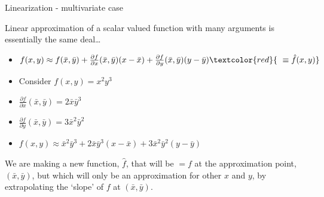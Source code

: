 \begin{frame}{Linearization - multivariate case}

Linear approximation of a scalar valued function with many arguments is essentially the same deal\ldots
\begin{itemize}
\item	$f(x,y) \approx f(\bar{x},\bar{y}) + \frac{\partial f}{\partial x}(\bar{x},\bar{y})(x-\bar{x}) + \frac{\partial f}{\partial y}(\bar{x},\bar{y})(y-\bar{y}) \textcolor{red}{\text{ }\equiv \hat{f}(x,y)}$
\end{itemize}

\begin{itemize}
\item	Consider $f(x,y) = x^{2} y^{3}$
\item	$\frac{\partial f}{\partial x}(\bar{x},\bar{y}) = 2\bar{x}\bar{y}^{3}$
\item	$\frac{\partial f}{\partial y}(\bar{x},\bar{y}) = 3\bar{x}^{2}\bar{y}^{2}$
\item	$f(x,y) \approx \bar{x}^{2} \bar{y}^{3} +  2\bar{x}\bar{y}^{3}(x-\bar{x}) + 3\bar{x}^{2}\bar{y}^{2}(y-\bar{y})$
\end{itemize}

\vspace{2mm}
We are making a new function, $\hat{f}$, that will be $=f$ at the approximation point, $(\bar{x},\bar{y})$, but which will only be an approximation for other $x$ and $y$, by extrapolating the `slope' of $f$ at $(\bar{x},\bar{y})$.

\end{frame}



